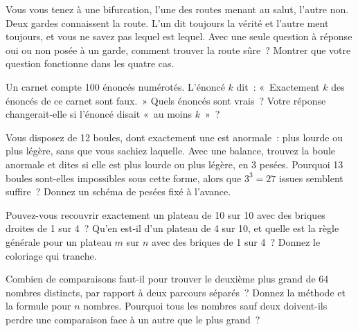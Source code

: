 \begin{question}\label{iq:iv1:logic-riddles:25}
Vous vous tenez à une bifurcation, l'une des routes menant au salut, l'autre non. Deux gardes connaissent la route. L'un dit toujours la vérité et l'autre ment toujours, et vous ne savez pas lequel est lequel. Avec une seule question à réponse oui ou non posée à un garde, comment trouver la route sûre~? Montrer que votre question fonctionne dans les quatre cas.
\end{question}

\begin{question}\label{iq:iv1:logic-riddles:26}
Un carnet compte 100 énoncés numérotés. L'énoncé $k$ dit~: «~Exactement $k$ des énoncés de ce carnet sont faux.~» Quels énoncés sont vrais~? Votre réponse changerait-elle si l'énoncé disait «~au moins $k$~»~?
\end{question}

\begin{question}\label{iq:iv1:logic-riddles:27}
Vous disposez de 12 boules, dont exactement une est anormale~: plus lourde ou plus légère, sans que vous sachiez laquelle. Avec une balance, trouvez la boule anormale et dites si elle est plus lourde ou plus légère, en 3 pesées. Pourquoi 13 boules sont-elles impossibles sous cette forme, alors que $3^3 = 27$ issues semblent suffire~? Donnez un schéma de pesées fixé à l'avance.
\end{question}

\begin{question}\label{iq:iv1:logic-riddles:28}
Pouvez-vous recouvrir exactement un plateau de 10 sur 10 avec des briques droites de 1 sur 4~? Qu'en est-il d'un plateau de 4 sur 10, et quelle est la règle générale pour un plateau $m$ sur $n$ avec des briques de 1 sur 4~? Donnez le coloriage qui tranche.
\end{question}

\begin{question}\label{iq:iv1:logic-riddles:29}
Combien de comparaisons faut-il pour trouver le deuxième plus grand de 64 nombres distincts, par rapport à deux parcours séparés~? Donnez la méthode et la formule pour $n$ nombres. Pourquoi tous les nombres sauf deux doivent-ils perdre une comparaison face à un autre que le plus grand~?
\end{question}

